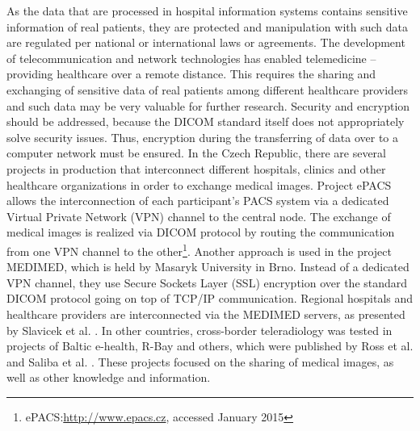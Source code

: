 As the data that are processed in hospital information systems contains sensitive information of real patients, they are protected  and manipulation with such data are regulated per national or international laws or agreements. The development of telecommunication and network technologies has enabled telemedicine -- providing healthcare over a remote distance. This  requires the sharing and exchanging of sensitive data of real patients among different healthcare providers and such data may be very valuable for further research. Security and encryption should be addressed, because the DICOM standard itself does not appropriately solve security issues. Thus, encryption during the transferring of data over to a computer network must be ensured.
In the Czech Republic, there are several projects in production that interconnect different hospitals, clinics and other healthcare organizations in order to exchange medical images. Project ePACS allows the interconnection of each participant's PACS system via a dedicated Virtual Private Network (VPN) channel to the central node. The exchange of medical images is realized via DICOM protocol by routing the communication from one VPN channel to the other\footnote{ePACS:\url{http://www.epacs.cz}, accessed January 2015}. Another approach is used in the project MEDIMED, which is held by Masaryk University in Brno. Instead of a dedicated VPN channel, they use Secure Sockets Layer (SSL) encryption over the standard DICOM protocol going on top of TCP/IP communication. Regional hospitals and healthcare providers are interconnected via the MEDIMED servers, as presented by Slavicek et al. \cite{Slavicek2010}.%
In other countries, cross-border teleradiology was tested in projects of Baltic e-health, R-Bay and others, which were published by Ross et al. \cite{Ross2010} and Saliba et al. \cite{Saliba2012}.
These projects focused on the sharing of medical images, as well as other knowledge and information.

